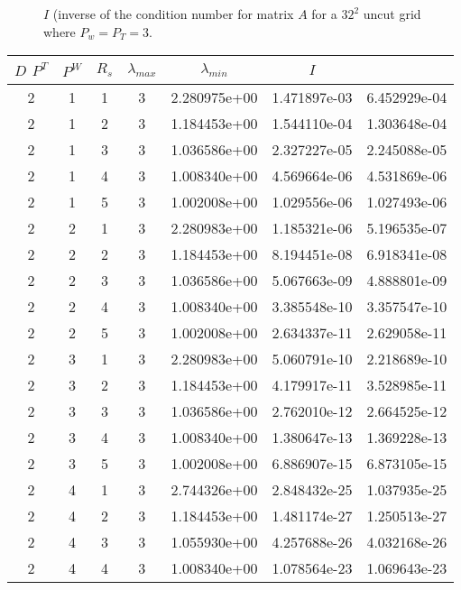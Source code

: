 \documentclass{article}
\begin{document}
\begin{figure}
\centerline{ }
\label{fig::T3W3}
\caption
    {
      $I$ (inverse of the condition number for matrix $A$ for a $32^2$
      uncut grid where $P_w = P_T = 3$.
    }
\end{figure}


\begin{table}
\begin{center}
\begin{tabular}{|cccc|ccc|} \hline
$D$ $P^T$  & $P^W$ & $R_s$ & $\lambda_{max}$ & $\lambda_{min}$   & $I$ \\
  \hline
2 & 1 & 1 & 3 & 2.280975e+00 & 1.471897e-03 & 6.452929e-04 \\ 
2 & 1 & 2 & 3 & 1.184453e+00 & 1.544110e-04 & 1.303648e-04 \\ 
2 & 1 & 3 & 3 & 1.036586e+00 & 2.327227e-05 & 2.245088e-05 \\ 
2 & 1 & 4 & 3 & 1.008340e+00 & 4.569664e-06 & 4.531869e-06 \\ 
2 & 1 & 5 & 3 & 1.002008e+00 & 1.029556e-06 & 1.027493e-06 \\ 
2 & 2 & 1 & 3 & 2.280983e+00 & 1.185321e-06 & 5.196535e-07 \\ 
2 & 2 & 2 & 3 & 1.184453e+00 & 8.194451e-08 & 6.918341e-08 \\ 
2 & 2 & 3 & 3 & 1.036586e+00 & 5.067663e-09 & 4.888801e-09 \\ 
2 & 2 & 4 & 3 & 1.008340e+00 & 3.385548e-10 & 3.357547e-10 \\ 
2 & 2 & 5 & 3 & 1.002008e+00 & 2.634337e-11 & 2.629058e-11 \\ 
2 & 3 & 1 & 3 & 2.280983e+00 & 5.060791e-10 & 2.218689e-10 \\ 
2 & 3 & 2 & 3 & 1.184453e+00 & 4.179917e-11 & 3.528985e-11 \\ 
2 & 3 & 3 & 3 & 1.036586e+00 & 2.762010e-12 & 2.664525e-12 \\ 
2 & 3 & 4 & 3 & 1.008340e+00 & 1.380647e-13 & 1.369228e-13 \\ 
2 & 3 & 5 & 3 & 1.002008e+00 & 6.886907e-15 & 6.873105e-15 \\ 
2 & 4 & 1 & 3 & 2.744326e+00 & 2.848432e-25 & 1.037935e-25 \\ 
2 & 4 & 2 & 3 & 1.184453e+00 & 1.481174e-27 & 1.250513e-27 \\ 
2 & 4 & 3 & 3 & 1.055930e+00 & 4.257688e-26 & 4.032168e-26 \\ 
2 & 4 & 4 & 3 & 1.008340e+00 & 1.078564e-23 & 1.069643e-23 \\ 

\end{tabular}
\end{center}
\end{table}
\end{document}
